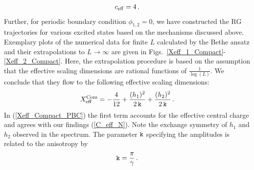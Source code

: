 \documentclass[12pt]{article}
\numberwithin{equation}{section}
\newcommand{\kk}{{\tt k}}
\begin{document}
\begin{align}
    c_{\rm{eff}}=4\,.\label{C_eff_N}
\end{align}
Further, for periodic boundary condition $\phi_{1,2}=0$, we have constructed the RG trajectories for various excited states based on the mechanisms discussed above.  Exemplary plots of the numerical data for finite $L$ calculated by the Bethe ansatz and their extrapolations to $L\to \infty$ are given in Figs.~\ref{Xeff_1_Compact}-\ref{Xeff_2_Compact}. Here, the extrapolation procedure is based on the assumption that the effective scaling dimensions are rational functions of $\frac{1}{\log(L)}$.  We conclude that they flow to the following effective scaling dimensions:
\begin{align}
    X^{\rm{Com}}_{\mathrm{eff}}=-\frac{4}{12}+\frac{(h_1     )^2}{2 \,\kk}
     +\frac{( h_2 )^2}{2 \,\kk} \,.\label{Xeff_Compact_PBC}
\end{align}
In (\ref{Xeff_Compact_PBC}) the first term accounts for the effective central charge and agrees with our findings (\ref{C_eff_N}).  Note the exchange symmetry of $h_1 $ and $h_2$ observed in the spectrum. The parameter $\kk$ specifying the amplitudes is related to the anisotropy by 
\begin{align}
    \kk=\frac{\pi}{\gamma}\,.
\end{align}
\end{document}
